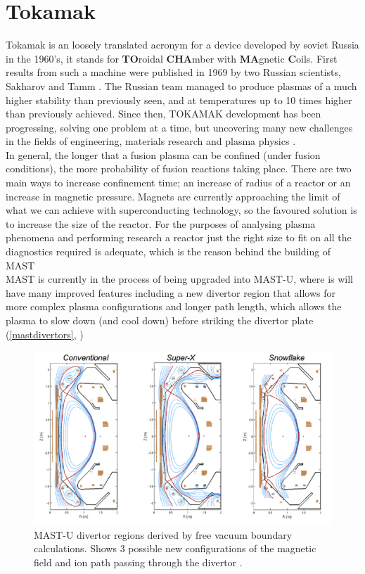 \documentclass[12pt,a4paper,oneside]{report}
\begin{document}
	\section{Tokamak}
Tokamak is an loosely translated acronym for a device developed by soviet Russia in the 1960's, it stands for \textbf{TO}roidal \textbf{CHA}mber with \textbf{MA}gnetic \textbf{C}oils. First results from such a machine were published in 1969 by two Russian scientists, Sakharov and Tamm \cite{Tamm1959TheoryI}. The Russian team managed to produce plasmas of a much higher stability than previously seen, and at temperatures up to 10 times higher than previously achieved. Since then, TOKAMAK development has been progressing, solving one problem at a time, but uncovering many new challenges in the fields of engineering, materials research and plasma physics \cite{Smirnov2010Tokamak19501990}.\\

In general, the longer that a fusion plasma can be confined (under fusion conditions), the more probability of fusion reactions taking place. There are two main ways to increase confinement time; an increase of radius of a reactor or an increase in magnetic pressure. Magnets are currently approaching the limit of what we can achieve with superconducting technology, so the favoured solution is to increase the size of the reactor. For the purposes of analysing plasma phenomena and performing research a reactor just the right size to fit on all the diagnostics required is adequate, which is the reason behind the building of MAST \cite{Chapman2015OverviewResults}\\

MAST is currently in the process of being upgraded into MAST-U, where is will have many improved features including a new divertor region that allows for more complex plasma configurations and longer path length, which allows the plasma to slow down (and cool down) before striking the divertor plate (\autoref{mastdivertors}, \cite{CulhamCenterforFusionEnergyResearch:Upgrade})

\begin{figure}[H]
\includegraphics[width=1\textwidth, center,angle=0]{Images/MASTUdivertors}
\caption{MAST-U divertor regions derived by free vacuum boundary calculations. Shows 3 possible new configurations of the magnetic field and ion path passing through the divertor \cite{CulhamCenterforFusionEnergyResearch:Upgrade}.}
\label{mastdivertors}
\end{figure}
\end{document}
